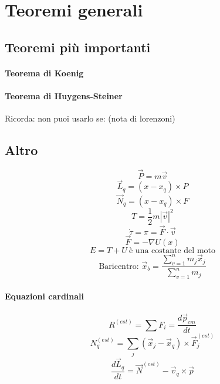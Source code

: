 \documentclass[a4paper,12pt]{article}
\begin{document}
\section{Teoremi generali}
\subsection{Teoremi più importanti}
\paragraph{Teorema di Koenig}

\paragraph{Teorema di Huygens-Steiner}
Ricorda: non puoi usarlo se: (nota di lorenzoni)

\subsection{Altro}
$$\vec{P}=m\vec{v} $$
$$ \vec{L}_q = (x-x_q)\times P$$
$$\vec{N}_q = (x-x_q)\times F $$
$$ T = \frac{1}{2} m|\vec{v}|^2 $$
$$ \dot{\tau} = \pi = \vec{F}\cdot\vec{v}$$
$$ \vec{F} = -\nabla U(x)$$
$$E = T+U\ \text{è una costante del moto} $$
$$\text{Baricentro: } \vec{x}_b = \dfrac{\sum_{v=1}^n m_j \vec{x}_j}{\sum_{v=1}^n m_j} $$
\paragraph{Equazioni cardinali}
$$ R^{(est)} = \sum F_i = \frac{d\vec{p}_{cm}}{dt}$$
$$ N_q^{(est)} = \sum_j (\vec{x}_j-\vec{x}_q)\times \vec{F}_j^{(est)} $$
$$ \frac{d\vec{L}_q}{dt}=\vec{N}^{(est)}-\vec{v}_q\times\vec{p}$$
\end{document}
